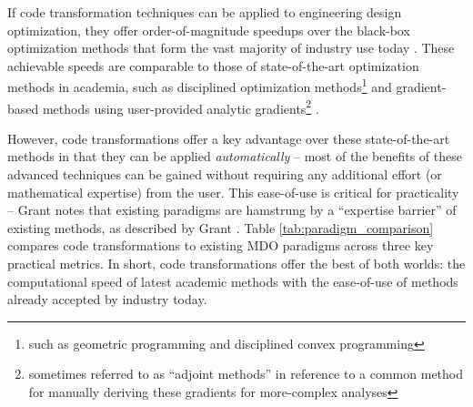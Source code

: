 \documentclass[12pt,vi,oneside]{report}
\begin{document}
    If code transformation techniques can be applied to engineering design optimization, they offer order-of-magnitude speedups over the black-box optimization methods that form the vast majority of industry use today \cite{martins_engineering_2021, lavin_simulation_2022}. These achievable speeds are comparable to those of state-of-the-art optimization methods in academia, such as disciplined optimization methods\footnote{such as geometric programming and disciplined convex programming} \cite{grant_disciplined_2006, gpkit, boyd_convex_2004, agrawal_disciplined_2019} and gradient-based methods using user-provided analytic gradients\footnote{sometimes referred to as ``adjoint methods'' in reference to a common method for manually deriving these gradients for more-complex analyses} \cite{gray_openmdao_2019, kenway_effective_2019, innes_don_2019}.

    However, code transformations offer a key advantage over these state-of-the-art methods in that they can be applied \textit{automatically} -- most of the benefits of these advanced techniques can be gained without requiring any additional effort (or mathematical expertise) from the user. This ease-of-use is critical for practicality -- Grant notes that existing paradigms are hamstrung by a ``expertise barrier'' of existing methods, as described by Grant \cite{grant_disciplined_2006}. Table \ref{tab:paradigm_comparison} compares code transformations to existing MDO paradigms across three key practical metrics. In short, code transformations offer the best of both worlds: the computational speed of latest academic methods with the ease-of-use of methods already accepted by industry today.
\end{document}
